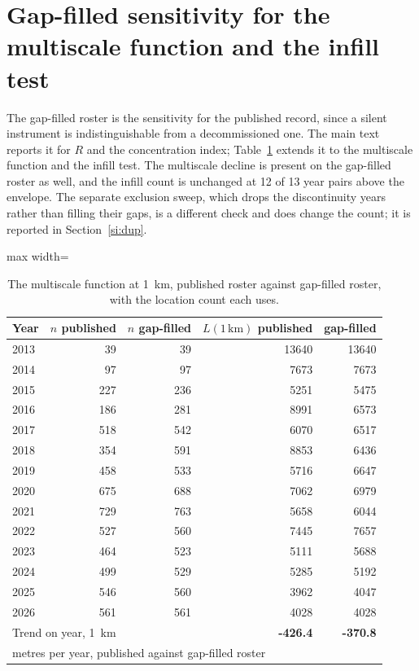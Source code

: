 \documentclass[fleqn,10pt]{wlpeerj}
\begin{document}
\section{Gap-filled sensitivity for the multiscale function and the infill test}
\label{si:gapfill}

The gap-filled roster is the sensitivity for the published record, since a silent instrument is
indistinguishable from a decommissioned one. The main text reports it for $R$ and the
concentration index; Table~\ref{si:gapL} extends it to the multiscale function and the infill
test. The multiscale decline is present on the gap-filled roster as well, and the infill count
is unchanged at 12 of 13 year pairs above the envelope. The separate exclusion sweep, which
drops the discontinuity years rather than filling their gaps, is a different check and does
change the count; it is reported in Section~\ref{si:dup}.

\begin{table}[H]
\centering
\caption{The multiscale function at \SI{1}{\kilo\meter}, published roster against gap-filled
roster, with the location count each uses.}
\label{si:gapL}
\small
\begin{adjustbox}{max width=\linewidth}
\begin{tabular}{lrrrr}
\toprule
Year & $n$ published & $n$ gap-filled & $L(1\,\mathrm{km})$ published & gap-filled \\
\midrule
2013 & 39 & 39 & 13640 & 13640 \\
2014 & 97 & 97 & 7673 & 7673 \\
2015 & 227 & 236 & 5251 & 5475 \\
2016 & 186 & 281 & 8991 & 6573 \\
2017 & 518 & 542 & 6070 & 6517 \\
2018 & 354 & 591 & 8853 & 6436 \\
2019 & 458 & 533 & 5716 & 6647 \\
2020 & 675 & 688 & 7062 & 6979 \\
2021 & 729 & 763 & 5658 & 6044 \\
2022 & 527 & 560 & 7445 & 7657 \\
2023 & 464 & 523 & 5111 & 5688 \\
2024 & 499 & 529 & 5285 & 5192 \\
2025 & 546 & 560 & 3962 & 4047 \\
2026 & 561 & 561 & 4028 & 4028 \\
\midrule
\multicolumn{3}{l}{Trend on year, \SI{1}{\kilo\meter}} & \textbf{-426.4} & \textbf{-370.8} \\
\multicolumn{5}{l}{metres per year, published against gap-filled roster} \\
\bottomrule
\end{tabular}
\end{adjustbox}
\end{table}
\end{document}
